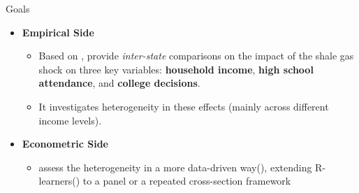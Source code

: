 \documentclass[12pt,  aspectratio=169]{beamer}    %
\begin{document}
\begin{frame}{Goals}

\begin{itemize}
    \item[]  \textbf{\large  Empirical  Side}
    \begin{itemize}
        \item  Based  on  \textcite{sun_estimating_2021},  provide  \textit{inter-state}  comparisons  on  the  impact  of  the  shale  gas  shock  on  three  key  variables:  \textbf{household  income},  \textbf{high  school  attendance},  and  \textbf{college  decisions}.
        \item  It  investigates  heterogeneity  in  these  effects  (mainly  across  different  income  levels).
    \end{itemize}

    \vfill

    \item[]  \textbf{\large  Econometric  Side}
    \begin{itemize}
        \item  assess  the  heterogeneity  in  a  more  data-driven  way(\cite{athey2016recursive}),  extending  R-learners(\cite{wager2018estimation})  to  a  panel  or  a  repeated  cross-section  framework
    \end{itemize}
\end{itemize}

\end{frame}
\end{document}
